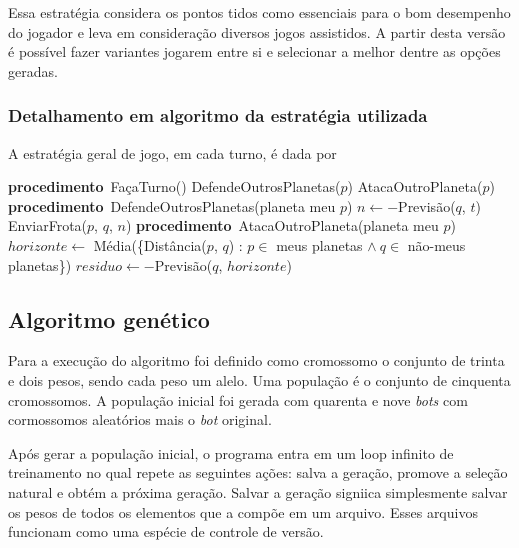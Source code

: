 \documentclass[a4paper,titlepage,11pt]{article}
\newcommand\PROC{\STATE\textbf{procedimento}\ }
\begin{document}
Essa estratégia considera os pontos tidos como essenciais para o bom desempenho do jogador e leva em consideração diversos jogos assistidos. A partir desta versão é possível fazer variantes jogarem entre si e selecionar a melhor dentre as opções geradas.

\subsubsection{Detalhamento em algoritmo da estratégia utilizada}

A estratégia geral de jogo, em cada turno, é dada por

\begin{algorithmic}
	\PROC FaçaTurno()
	\FORALL {planeta meu $p$}
		\STATE DefendeOutrosPlanetas($p$)
		\STATE AtacaOutroPlaneta($p$)
	\ENDFOR
	\STATE 
	\PROC DefendeOutrosPlanetas(planeta meu $p$)
			\STATE $n \gets  -$Previsão($q$, $t$)
				\STATE EnviarFrota($p$, $q$, $n$)
			\ENDIF
		\ENDIF
	\ENDFOR
	\STATE
	\PROC AtacaOutroPlaneta(planeta meu $p$)
		\STATE $horizonte \gets$ Média(\{Distância($p$, $q$) : $p \in$ meus planetas $\wedge\ q \in$ não-meus planetas\})
			\STATE $residuo \gets -$Previsão($q$, $horizonte$)
				\STATE 
			\ENDIF
		\ENDIF
	\ENDFOR
\end{algorithmic}



\subsection{Algoritmo genético}
Para a execução do algoritmo foi definido como cromossomo o conjunto de trinta e dois pesos, sendo cada peso um alelo. Uma população é o conjunto de cinquenta cromossomos. A população inicial foi gerada com quarenta e nove {\em bots} com cormossomos aleatórios mais o {\em bot} original.

Após gerar a população inicial, o programa entra em um loop infinito de treinamento no qual repete as seguintes ações: salva a geração, promove a seleção natural e obtém a próxima geração. Salvar a geração signiica simplesmente salvar os pesos de todos os elementos que a compõe em um arquivo. Esses arquivos funcionam como uma espécie de controle de versão.
\end{document}

